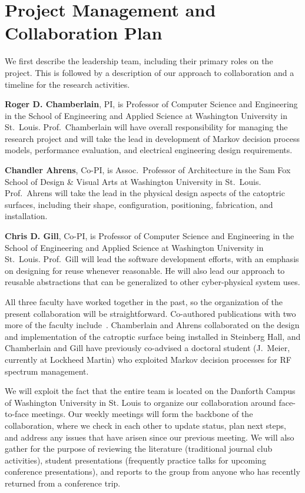 \section{Project Management and Collaboration Plan}
\label{sec:collab}

We first describe the leadership team, including their primary roles
on the project.  This is followed by a description of our approach
to collaboration and a timeline for the research activities.

{\bf Roger D. Chamberlain}, PI, is Professor of Computer Science
and Engineering in the School of Engineering and Applied Science
at Washington University in St.~Louis.
Prof.~Chamberlain will have overall responsibility for managing the
research project and will take the lead in development of Markov
decision process models, performance evaluation, and electrical engineering
design requirements.

{\bf Chandler Ahrens}, Co-PI, is Assoc.~Professor of Architecture
in the Sam Fox School of Design \& Visual Arts
at Washington University in St.~Louis.
Prof.~Ahrens will take the lead in the physical design aspects of
the catoptric surfaces, including their shape, configuration, positioning,
fabrication, and installation.

{\bf Chris D. Gill}, Co-PI, is Professor of Computer Science
and Engineering in the School of Engineering and Applied Science
at Washington University in St.~Louis.
Prof.~Gill will lead the software development efforts, with an emphasis
on designing for reuse whenever reasonable.  He will also lead our
approach to reusable abstractions that can be generalized to other
cyber-physical system uses.

All three faculty have worked together in the past, so the organization
of the present collaboration will be straightforward.  Co-authored
publications with two more of the faculty
include~\cite{cag18,mgc16, mskgct13}. Chamberlain and Ahrens collaborated
on the design and implementation of the catroptic surface being
installed in Steinberg Hall, and Chamberlain and Gill have previously
co-advised a doctoral student (J.~Meier, currently at Lockheed Martin)
who exploited Markov decision processes for RF spectrum management.

We will exploit the fact that the entire team is located on the
Danforth Campus of Washington University in St. Louis to organize
our collaboration around face-to-face meetings.  Our weekly meetings will
form the backbone of the collaboration, where we check in each other to
update status, plan next steps, and address any issues that have arisen
since our previous meeting.
We will also gather for the purpose of reviewing the literature
(traditional journal club activities), student presentations (frequently
practice talks for upcoming conference presentations), and reports
to the group from anyone who has recently returned from a conference trip.

